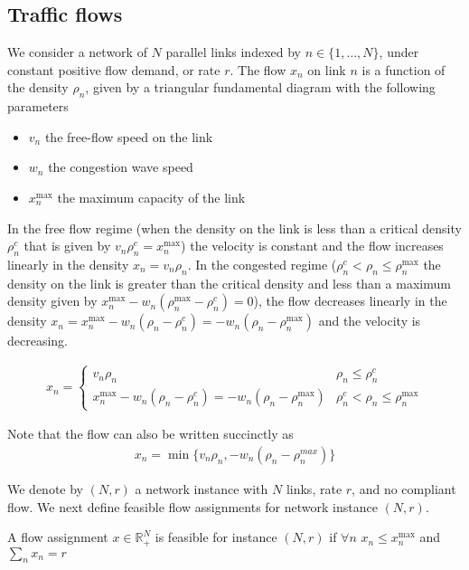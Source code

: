 \subsection{Traffic flows}
We consider a network of $N$ parallel links indexed by $n \in \{1, \dots, N \}$, under constant positive flow demand, or rate $r$. The flow $x_n$ on link $n$ is a function of the density $\rho_n$, given by a triangular fundamental diagram with the following parameters
\begin{itemize}
\item $v_n$ the free-flow speed on the link
\item $w_n$ the congestion wave speed
\item $x_n^{\max}$ the maximum capacity of the link
\end{itemize}
In the free flow regime (when the density on the link is less than a critical density $\rho_n^c$ that is given by $v_n\rho_n^c = x_n^{\max}$) the velocity is constant and the flow increases linearly in the density $x_n = v_n \rho_n$. In the congested regime ($\rho_n^c < \rho_n \leq \rho_n^{\max}$ the density on the link is greater than the critical density and less than a maximum density given by $x_n^{\max} - w_n(\rho_n^{\max} - \rho_n^c) = 0$), the flow decreases linearly in the density $x_n = x_n^{\max} - w_n(\rho_n - \rho_n^c) = - w_n(\rho_n - \rho_n^{\max})$ and the velocity is decreasing.

\begin{align}
\label{eq:flow} x_n = 
\begin{cases}
v_n \rho_n & \rho_n \leq \rho_n^c\\
x_n^{\max} - w_n(\rho_n - \rho_n^c) = - w_n(\rho_n - \rho_n^{\max})  & \rho_n^c < \rho_n \leq \rho_n^{\max}
\end{cases}
\end{align}

Note that the flow can also be written succinctly as
\begin{align}
\label{eq:flow_min}
x_n = \min \{ v_n \rho_n, - w_n(\rho_n - \rho_n^{max})\}
\end{align}

We denote by $(N, r)$ a network instance with $N$ links, rate $r$, and no compliant flow. We next define feasible flow assignments for network instance $(N, r)$.

\begin{definition}
A flow assignment $x \in \mathbb{R}_+^N$ is feasible for instance $(N, r)$ if $\forall n$ $x_n \leq x_n^{\max}$ and $\sum_n x_n = r$
\end{definition}

